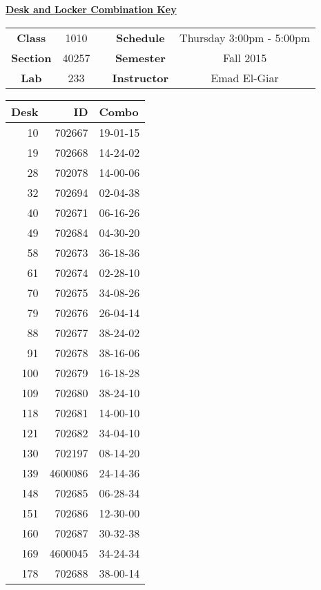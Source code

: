 \documentclass[12pt]{article}
\begin{document}
\thispagestyle{empty}

\begin{center}
	{\huge\textbf{\underline{ Desk and Locker Combination Key}}}
\end{center}


\begin{table}[h]
  \centering
  \begin{tabular}{ccccc}

  \textbf{Class} & 1010 & {\qquad} &\textbf{Schedule} & Thursday 3:00pm - 5:00pm \\
  \textbf{Section} & 40257 & {\qquad} & \textbf{Semester} & Fall 2015 \\
  \textbf{Lab} & 233 & {\qquad} & \textbf{Instructor} & Emad El-Giar \\
  \end{tabular}
\end{table}
 \vspace{0.1in}
\begin{minipage}{0.4\textwidth}

\begin{tabular}{rrl}
\toprule
 Desk &       ID &     Combo \\
\midrule
   10 &   702667 &  19-01-15 \\
   19 &   702668 &  14-24-02 \\
   28 &   702078 &  14-00-06 \\
   32 &   702694 &  02-04-38 \\
   40 &   702671 &  06-16-26 \\
   49 &   702684 &  04-30-20 \\
   58 &   702673 &  36-18-36 \\
   61 &   702674 &  02-28-10 \\
   70 &   702675 &  34-08-26 \\
   79 &   702676 &  26-04-14 \\
   88 &   702677 &  38-24-02 \\
   91 &   702678 &  38-16-06 \\
  100 &   702679 &  16-18-28 \\
  109 &   702680 &  38-24-10 \\
  118 &   702681 &  14-00-10 \\
  121 &   702682 &  34-04-10 \\
  130 &   702197 &  08-14-20 \\
  139 &  4600086 &  24-14-36 \\
  148 &   702685 &  06-28-34 \\
  151 &   702686 &  12-30-00 \\
  160 &   702687 &  30-32-38 \\
  169 &  4600045 &  34-24-34 \\
  178 &   702688 &  38-00-14 \\
\bottomrule
\end{tabular}


\end{minipage}
\end{document}
